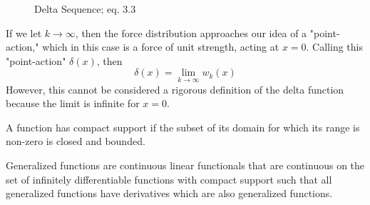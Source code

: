 \begin{figure}
    \centering
    \caption{Delta Sequence;  eq. 3.3}
\end{figure}

If we let \(k \rightarrow \infty\), then the force distribution approaches our idea of a "point-action," which in this case is a force of unit strength, acting at \(x=0\). Calling this "point-action" \(\delta(x)\), then
\begin{equation}
    \delta(x) = \lim_{k\rightarrow \infty} w_k(x)
\end{equation}
However, this cannot be considered a rigorous definition of the delta function because the limit is infinite for \(x=0\). 

\begin{definition}
    A function has compact support if the subset of its domain for which its range is non-zero is closed and bounded.
\end{definition}

\begin{definition}
    Generalized functions are continuous linear functionals that are continuous on the set of infinitely differentiable functions with compact support such that all generalized functions have derivatives which are also generalized functions.
\end{definition}

